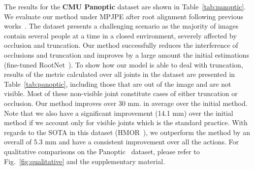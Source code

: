  
The results for the \textbf{CMU Panoptic} dataset are shown in Table~\ref{tab:panoptic}. We evaluate our method under MPJPE after root alignment following previous works~\cite{zanfir_cvpr_2018_multiple,zanfir_multipeople_nips18}. The dataset presents a challenging scenario as the majority of images contain several people at a time in a closed environment, severely affected by occlusion and truncation. Our method successfully reduces the interference of occlusions and truncation and improves by a large amount the initial estimations (fine-tuned RootNet~\cite{Moon_2019_ICCV_3DMPPE}). To show how our model is able to deal with truncation, results of the metric calculated over all joints in the dataset are presented in Table~\ref{tab:panoptic}, including those that are out of the image and are not visible. Most of these non-visible joint constitute cases of either truncation or occlusion. Our method improves over 30 mm. in average over the initial method. Note that we also have a significant improvement (14.1 mm) over the initial method if we account only for visible joints which is the standard practice. With regards to the SOTA in this dataset (HMOR~\cite{HMOR2020}), we outperform the method by an overall of 5.3 mm and have a consistent improvement over all the actions. For qualitative comparisons on the Panoptic~\cite{panoptic} dataset, please refer to Fig.~\ref{fig:qualitative} and the supplementary material. 


